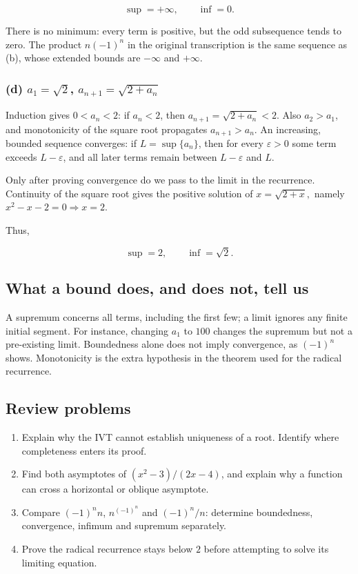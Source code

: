 \documentclass[11pt,a4paper]{article}
\begin{document}
\[
\sup=+\infty,
\qquad\inf=0.
\]

There is no minimum: every term is positive, but the odd subsequence
tends to zero. The product \(n(-1)^n\) in the original transcription is
the same sequence as (b), whose extended bounds are \(-\infty\) and
\(+\infty\).

\subsubsection{\texorpdfstring{(d) \(a_1=\sqrt2\),
\(a_{n+1}=\sqrt{2+a_n}\)}{(d) a\_1=\textbackslash sqrt2, a\_\{n+1\}=\textbackslash sqrt\{2+a\_n\}}}\label{d-a_1sqrt2-a_n1sqrt2a_n}

Induction gives \(0<a_n<2\): if \(a_n<2\), then
\(a_{n+1}=\sqrt{2+a_n}<2\). Also \(a_2>a_1\), and monotonicity of the
square root propagates \(a_{n+1}>a_n\). An increasing, bounded sequence
converges: if \(L=\sup\{a_n\}\), then for every \(\varepsilon>0\) some
term exceeds \(L-\varepsilon\), and all later terms remain between
\(L-\varepsilon\) and \(L\).

Only after proving convergence do we pass to the limit in the
recurrence. Continuity of the square root gives the positive solution of
\(x=\sqrt{2+x},\) namely \(x^2-x-2=0 \Rightarrow x=2.\)

Thus,

\[
\sup=2,
\qquad\inf=\sqrt2.
\]

\subsection{What a bound does, and does not, tell
us}\label{what-a-bound-does-and-does-not-tell-us}

A supremum concerns all terms, including the first few; a limit ignores
any finite initial segment. For instance, changing \(a_1\) to \(100\)
changes the supremum but not a pre-existing limit. Boundedness alone
does not imply convergence, as \((-1)^n\) shows. Monotonicity is the
extra hypothesis in the theorem used for the radical recurrence.

\subsection{Review problems}\label{review-problems}

\begin{enumerate}
\def\labelenumi{\arabic{enumi}.}
\item
  Explain why the IVT cannot establish uniqueness of a root. Identify
  where completeness enters its proof.
\item
  Find both asymptotes of \((x^2-3)/(2x-4)\), and explain why a function
  can cross a horizontal or oblique asymptote.
\item
  Compare \((-1)^n n\), \(n^{(-1)^n}\) and \((-1)^n/n\): determine
  boundedness, convergence, infimum and supremum separately.
\item
  Prove the radical recurrence stays below \(2\) before attempting to
  solve its limiting equation.
\end{enumerate}
\end{document}
